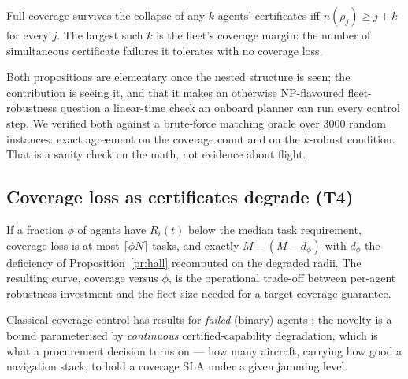 \documentclass[11pt,a4paper]{article}
\newcommand{\Ri}{R_i}
\begin{document}
\begin{proposition}
\label{pr:krobust}
Full coverage survives the collapse of any $k$ agents' certificates iff
$n(\rho_j)\ge j+k$ for every $j$. The largest such $k$ is the fleet's coverage
margin: the number of simultaneous certificate failures it tolerates with no
coverage loss.
\end{proposition}

\begin{honestly}
Both propositions are elementary once the nested structure is seen; the
contribution is seeing it, and that it makes an otherwise NP-flavoured
fleet-robustness question a linear-time check an onboard planner can run every
control step. We verified both against a brute-force matching oracle over 3000
random instances: exact agreement on the coverage count and on the $k$-robust
condition. That is a sanity check on the math, not evidence about flight.
\end{honestly}

\subsection{Coverage loss as certificates degrade (T4)}
\begin{proposition}
\label{pr:coverage}
If a fraction $\phi$ of agents have $\Ri(t)$ below the median task requirement,
coverage loss is at most $\lceil\phi N\rceil$ tasks, and exactly
$M-(M-d_\phi)$ with $d_\phi$ the deficiency of Proposition~\ref{pr:hall}
recomputed on the degraded radii. The resulting curve, coverage versus $\phi$,
is the operational trade-off between per-agent robustness investment and the
fleet size needed for a target coverage guarantee.
\end{proposition}
\noindent
Classical coverage control has results for \emph{failed} (binary) agents
\cite{cortes2004coverage}; the novelty is a bound parameterised by
\emph{continuous} certified-capability degradation, which is what a procurement
decision turns on --- how many aircraft, carrying how good a navigation stack, to
hold a coverage SLA under a given jamming level.

\end{document}

